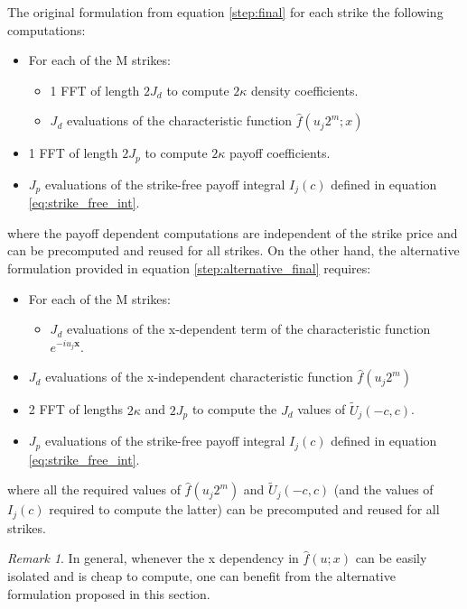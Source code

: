 \documentclass[12,twoside]{mammeTFM}
\theoremstyle{definition}
\theoremstyle{remark}
\newtheorem{remark}[thm]{Remark}
\begin{document}
The original formulation from equation \ref{step:final} for each strike the following computations: 
\begin{itemize}
\item For each of the M strikes:
\begin{itemize}
\item 1 FFT of length $2J_d$ to compute $2\kappa$ density coefficients.
\item $J_d$ evaluations of the characteristic function $\hat{f}(u_j 2^m;x)$
\end{itemize}
\item 1 FFT of length $2J_p$ to compute $2\kappa$ payoff coefficients.
\item $J_p$ evaluations of the strike-free payoff integral $I_j(c)$ defined in equation \ref{eq:strike_free_int}.
\end{itemize}

where the payoff dependent computations are independent of the strike price and can be precomputed and reused for all strikes.
On the other hand, the alternative formulation provided in equation \ref{step:alternative_final} requires:

\begin{itemize}
\item For each of the M strikes:
\begin{itemize}
\item $J_d$ evaluations of the x-dependent term of the characteristic function $e^{-iu_j \boldsymbol{x}}$.
\end{itemize}
\item $J_d$ evaluations of the x-independent characteristic function $\hat{f}(u_j 2^m)$
\item 2 FFT of lengths $2 \kappa$ and $2J_p$ to compute the $J_d$ values of $\tilde{U}_j(-c,c)$.
\item $J_p$ evaluations of the strike-free payoff integral $I_j(c)$ defined in equation \ref{eq:strike_free_int}.
\end{itemize}

where all the required values of $\hat{f}(u_j 2^m)$ and $\tilde{U}_j(-c,c)$ (and the values of $I_j(c)$ required to compute the latter) can be precomputed and reused for all strikes.

\begin{remark}
In general, whenever the x dependency in $\hat{f}(u; x)$ can be easily isolated and is cheap to compute, one can benefit from the alternative formulation proposed in this section.
\end{remark}
\end{document}
